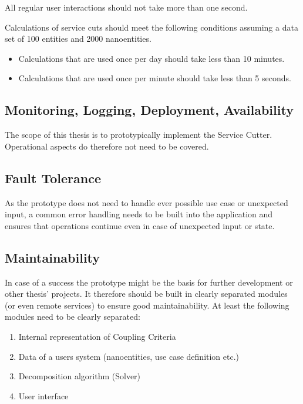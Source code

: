 All regular user interactions should not take more than one second.

Calculations of service cuts should meet the following conditions assuming a data set of 100 entities and 2000 nanoentities.

\begin{itemize}
\item Calculations that are used once per day should take less than 10 minutes.
\item Calculations that are used once per minute should take less than 5 seconds.
\end{itemize}

\subsection{Monitoring, Logging, Deployment, Availability}

The scope of this thesis is to prototypically implement the Service Cutter. Operational aspects do therefore not need to be covered. 

\subsection{Fault Tolerance}

As the prototype does not need to handle ever possible use case or unexpected input, a common error handling needs to be built into the application and ensures that operations continue even in case of unexpected input or state.

\subsection{Maintainability}

In case of a success the prototype might be the basis for further development or other thesis' projects. It therefore should be built in clearly separated modules (or even remote services) to ensure good maintainability. At least the following modules need to be clearly separated:


\begin{enumerate}
	\item Internal representation of Coupling Criteria
	\item Data of a users system (nanoentities, use case definition etc.) 
	\item Decomposition algorithm (Solver)
	\item User interface
\end{enumerate}

